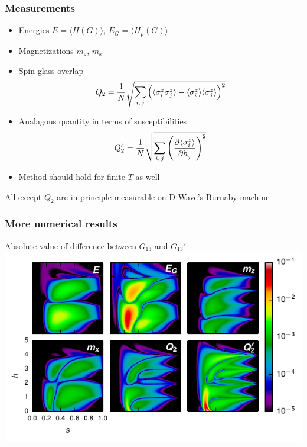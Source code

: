 \documentclass{beamer}
\newcommand{\ev}[1]{\langle #1 \rangle} %
\begin{document}
\appendix
\section{\appendixname}

\begin{frame}
  \frametitle{Measurements}
  \begin{itemize}
    \item Energies $E=\ev{H(G)}$, $E_G=\ev{H_p(G)}$
    \item Magnetizations $m_z$, $m_x$
    \item Spin glass overlap
    \begin{equation*}
      Q_2 = \frac{1}{N} \sqrt{
        \sum_{i,\,j} \del{
          \ev{\sigma^z_i \sigma^z_j} -
          \ev{\sigma^z_i} \ev{\sigma^z_j}
        }^2
      }
    \end{equation*}
    \item Analagous quantity in terms of susceptibilities
    \begin{equation*}
      Q_2' = \frac{1}{N} \sqrt{\sum_{i,\,j} \del{\dpd{\ev{\sigma^z_i}}{h_j}}^2}
    \end{equation*}

    \item Method should hold for finite $T$ as well
  \end{itemize}
  \alert{All except $Q_2$ are in principle measurable on D-Wave's Burnaby machine}
\end{frame}

\begin{frame}
  \frametitle{More numerical results}
  \begin{center}
    Absolute value of difference between $G_{13}$ and $G_{13}'$
    \includegraphics{delta-grid}
  \end{center}
\end{frame}
\end{document}
